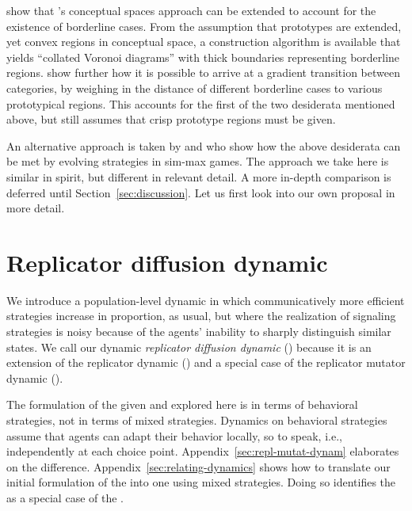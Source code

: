 \documentclass[fleqn,reqno,10pt]{article}
\newcommand{\rd}{\acro{rd}} %
\newcommand{\rmd}{\acro{rmd}} %
\newcommand{\rdd}{\acro{rdd}} %
\begin{document}
\citet{DouvenDecock2011:Vagueness:-A-Co} show that
\citeauthor{Gardenfors2000:Conceptual-Spac}'s conceptual spaces
approach can be extended to account for the existence of borderline
cases. From the assumption that prototypes are extended, yet convex
regions in conceptual space, a construction algorithm is available
that yields ``collated Voronoi diagrams'' with thick boundaries
representing borderline
regions. \citet{DecockDouven2012:What-is-Graded-} show further how it
is possible to arrive at a gradient transition between categories, by
weighing in the distance of different borderline cases to various
prototypical regions. This accounts for the first of the two
desiderata mentioned above, but still assumes that crisp prototype
regions must be given.

An alternative approach is taken by \citet{FrankeJager2010:Vagueness-Signa} and
\citet{OConnor2013:The-Evolution-o} who show how the above desiderata can be met by evolving
strategies in sim-max games. The approach we take here is similar in spirit, but different in
relevant detail. A more in-depth comparison is deferred until Section~\ref{sec:discussion}. Let
us first look into our own proposal in more detail.



\section{Replicator diffusion dynamic}
\label{sec:repl-diff-dynam}

We introduce a population-level dynamic in which communicatively more
efficient strategies increase in proportion, as usual, but where the
realization of signaling strategies is noisy because of the agents'
inability to sharply distinguish similar states. We call our dynamic
\emph{replicator diffusion dynamic} (\rdd) because it is an extension
of the replicator dynamic (\rd) and a special case of the replicator
mutator dynamic (\rmd).

The formulation of the \rdd given and explored here is in terms of behavioral strategies, not
in terms of mixed strategies. Dynamics on behavioral strategies assume that agents can adapt
their behavior locally, so to speak, i.e., independently at each choice
point. Appendix~\ref{sec:repl-mutat-dynam} elaborates on the
difference. Appendix~\ref{sec:relating-dynamics} shows how to translate our initial formulation
of the \rdd into one using mixed strategies. Doing so identifies the \rdd as a special case of
the \rmd.
\end{document}
